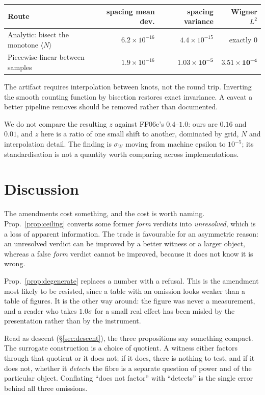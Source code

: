 \documentclass[11pt]{article}
\theoremstyle{remark}
\begin{document}
\begin{center}\small
\begin{tabular}{lrrr}
\toprule
Route & spacing mean dev. & spacing variance & Wigner $L^2$ \\
\midrule
Analytic: bisect the monotone $\langle N\rangle$ & $6.2\times10^{-16}$ & $4.4\times10^{-15}$ & exactly $0$ \\
Piecewise-linear between samples & $1.9\times10^{-16}$ & $\mathbf{1.03\times10^{-5}}$ & $\mathbf{3.51\times10^{-4}}$ \\
\bottomrule
\end{tabular}
\end{center}

The artifact requires interpolation between knots, not the round trip. Inverting the
smooth counting function by bisection restores exact invariance. A caveat a better
pipeline removes should be removed rather than documented.

We do not compare the resulting $z$ against FF06e's $0.4$--$1.0$: ours are $0.16$ and
$0.01$, and $z$ here is a ratio of one small shift to another, dominated by grid, $N$ and
interpolation detail. The finding is $\sigma_W$ moving from machine epsilon to
$10^{-5}$; its standardisation is not a quantity worth comparing across implementations.

\section{Discussion}

The amendments cost something, and the cost is worth naming. Prop.~\ref{prop:ceiling}
converts some former \emph{form} verdicts into \emph{unresolved}, which is a loss of
apparent information. The trade is favourable for an asymmetric reason: an unresolved
verdict can be improved by a better witness or a larger object, whereas a false
\emph{form} verdict cannot be improved, because it does not know it is wrong.

Prop.~\ref{prop:degenerate} replaces a number with a refusal. This is the amendment most
likely to be resisted, since a table with an omission looks weaker than a table of
figures. It is the other way around: the figure was never a measurement, and a reader
who takes $1.0\sigma$ for a small real effect has been misled by the presentation rather
than by the instrument.

Read as descent (\S\ref{sec:descent}), the three propositions say something compact. The
surrogate construction is a choice of quotient. A witness either factors through that
quotient or it does not; if it does, there is nothing to test, and if it does not, whether
it \emph{detects} the fibre is a separate question of power and of the particular object.
Conflating ``does not factor'' with ``detects'' is the single error behind all three
omissions.
\end{document}
